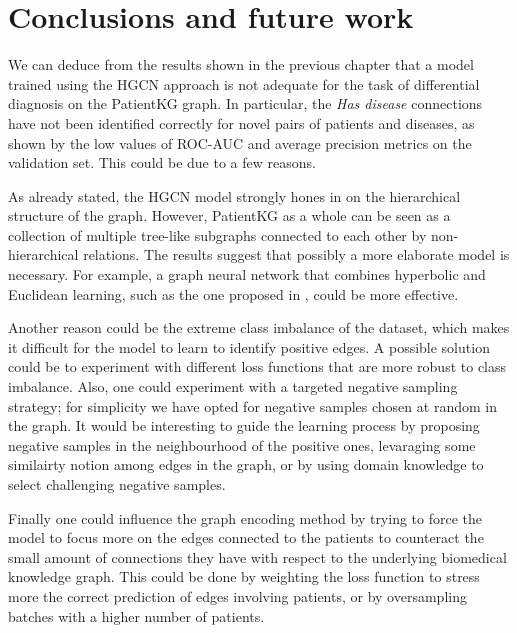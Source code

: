\chapter{Conclusions and future work}
We can deduce from the results shown in the previous chapter that a model trained using the HGCN approach is not adequate for the task of differential diagnosis on the PatientKG graph. In particular, the \emph{Has disease} connections have not been identified correctly for novel pairs of patients and diseases, as shown by the low values of ROC-AUC and average precision metrics on the validation set. This could be due to a few reasons. 

As already stated, the HGCN model strongly hones in on the hierarchical structure of the graph. However, PatientKG as a whole can be seen as a collection of multiple tree-like subgraphs connected to each other by non-hierarchical relations. The results suggest that possibly a more elaborate model is necessary. For example, a graph neural network that combines hyperbolic and Euclidean learning, such as the one proposed in \cite{chami2020hyperbolic}, could be more effective. 

Another reason could be the extreme class imbalance of the dataset, which makes it difficult for the model to learn to identify positive edges. A possible solution could be to experiment with different loss functions that are more robust to class imbalance. Also, one could experiment with a targeted negative sampling strategy; for simplicity we have opted for negative samples chosen at random in the graph. It would be interesting to guide the learning process by proposing negative samples in the neighbourhood of the positive ones, levaraging some similairty notion among edges in the graph, or by using domain knowledge to select challenging negative samples.

Finally one could influence the graph encoding method by trying to force the model to focus more on the edges connected to the patients to counteract the small amount of connections they have with respect to the underlying biomedical knowledge graph. This could be done by weighting the loss function to stress more the correct prediction of edges involving patients, or by oversampling batches with a higher number of patients.
